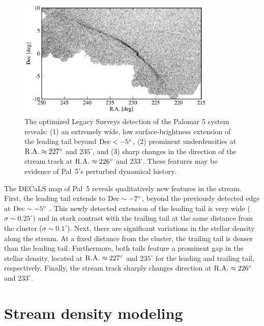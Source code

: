 \documentclass[twocolumn]{aastex62}
\begin{document}
\begin{figure}
\begin{center}
\includegraphics[width=0.85\textwidth]{fig2_map.pdf}
\end{center}
\caption{
The optimized Legacy Surveys detection of the Palomar 5 system reveals: (1) an extremely wide, low surface-brightness extension of the leading tail beyond $\rm Dec<-5^\circ$, (2) prominent underdensities at $\rm R.A.\approx 227^\circ$ and $235^\circ$, and (3) sharp changes in the direction of the stream track at $\rm R.A.\approx 226^\circ$ and $233^\circ$.
These features may be evidence of Pal~5's perturbed dynamical history.
}
\label{fig:map}
\end{figure}

The DECaLS map of Pal~5 reveals qualitatively new features in the stream.
First, the leading tail extends to $\rm Dec\sim-7^\circ$, beyond the previously detected edge at $\rm Dec\sim -5^\circ$ \citep{Bernard:2016}.
This newly detected extension of the leading tail is very wide ($\sigma\sim 0.25^\circ$) and in stark contrast with the trailing tail at the same distance from the cluster ($\sigma\sim 0.1^\circ$).
Next, there are significant variations in the stellar density along the stream.
At a fixed distance from the cluster, the trailing tail is denser than the leading tail.
Furthermore, both tails feature a prominent gap in the stellar density, located at $\rm R.A.\approx 227^\circ$ and $235^\circ$ for the leading and trailing tail, respectively.
Finally, the stream track sharply changes direction at $\rm R.A.\approx 226^\circ$ and $233^\circ$.

\section{Stream density modeling}
\label{sec:densitymodel}
\end{document}
